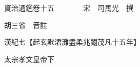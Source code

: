 










 


 
 


 

  
  
  
  
  





  
  
  
  
  
 
  

  

  
  
  



  

 
 

  
   




  

  
  


  　　資治通鑑卷十五　　　　宋　司馬光　撰

　　胡三省　音註

　　漢紀七【起玄黓涒灘盡柔兆閹茂凡十五年】

　　太宗孝文皇帝下

